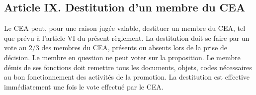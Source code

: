 \subsection{Article IX. Destitution d’un membre du CEA}
Le CEA peut, pour une raison jugée valable, destituer un membre du CEA, tel que prévu à l’article VI du présent règlement. La destitution doit se faire par un vote au 2/3 des membres du CEA, présents ou absents lors de la prise de décision. Le membre en question ne peut voter sur la proposition. Le membre démis de ses fonctions doit remettre tous les documents, objets, codes nécessaires au bon fonctionnement des activités de la promotion. La destitution est effective immédiatement une fois le vote effectué par le CEA.
